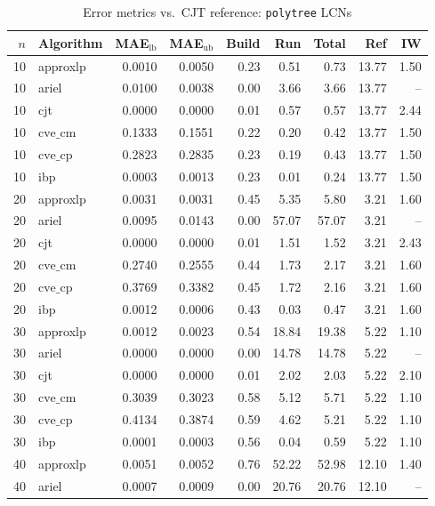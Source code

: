 \documentclass{article}
\begin{document}
\begin{table}[ht]
\centering
\caption{Error metrics vs.\ CJT reference: \texttt{polytree} LCNs}
\begin{tabular}{rlrrrrrrr}
\toprule
 $n$ & Algorithm & MAE$_{\text{lb}}$ & MAE$_{\text{ub}}$ & Build & Run & Total & Ref & IW \\
\midrule
 10 & approxlp & 0.0010 & 0.0050 & 0.23 & 0.51 & 0.73 & 13.77 & 1.50 \\
 10 & ariel & 0.0100 & 0.0038 & 0.00 & 3.66 & 3.66 & 13.77 & -- \\
 10 & cjt & 0.0000 & 0.0000 & 0.01 & 0.57 & 0.57 & 13.77 & 2.44 \\
 10 & $\text{cve\_cm}$ & 0.1333 & 0.1551 & 0.22 & 0.20 & 0.42 & 13.77 & 1.50 \\
 10 & $\text{cve\_cp}$ & 0.2823 & 0.2835 & 0.23 & 0.19 & 0.43 & 13.77 & 1.50 \\
 10 & ibp & 0.0003 & 0.0013 & 0.23 & 0.01 & 0.24 & 13.77 & 1.50 \\
\hline
 20 & approxlp & 0.0031 & 0.0031 & 0.45 & 5.35 & 5.80 & 3.21 & 1.60 \\
 20 & ariel & 0.0095 & 0.0143 & 0.00 & 57.07 & 57.07 & 3.21 & -- \\
 20 & cjt & 0.0000 & 0.0000 & 0.01 & 1.51 & 1.52 & 3.21 & 2.43 \\
 20 & $\text{cve\_cm}$ & 0.2740 & 0.2555 & 0.44 & 1.73 & 2.17 & 3.21 & 1.60 \\
 20 & $\text{cve\_cp}$ & 0.3769 & 0.3382 & 0.45 & 1.72 & 2.16 & 3.21 & 1.60 \\
 20 & ibp & 0.0012 & 0.0006 & 0.43 & 0.03 & 0.47 & 3.21 & 1.60 \\
\hline
 30 & approxlp & 0.0012 & 0.0023 & 0.54 & 18.84 & 19.38 & 5.22 & 1.10 \\
 30 & ariel & 0.0000 & 0.0000 & 0.00 & 14.78 & 14.78 & 5.22 & -- \\
 30 & cjt & 0.0000 & 0.0000 & 0.01 & 2.02 & 2.03 & 5.22 & 2.10 \\
 30 & $\text{cve\_cm}$ & 0.3039 & 0.3023 & 0.58 & 5.12 & 5.71 & 5.22 & 1.10 \\
 30 & $\text{cve\_cp}$ & 0.4134 & 0.3874 & 0.59 & 4.62 & 5.21 & 5.22 & 1.10 \\
 30 & ibp & 0.0001 & 0.0003 & 0.56 & 0.04 & 0.59 & 5.22 & 1.10 \\
\hline
 40 & approxlp & 0.0051 & 0.0052 & 0.76 & 52.22 & 52.98 & 12.10 & 1.40 \\
 40 & ariel & 0.0007 & 0.0009 & 0.00 & 20.76 & 20.76 & 12.10 & -- \\

\end{tabular}
\end{table}
\end{document}
